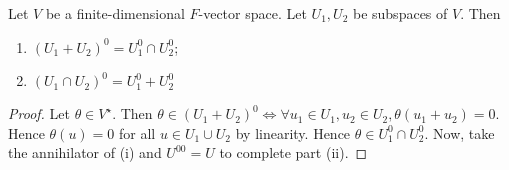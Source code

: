 \begin{lemma}
	Let $V$ be a finite-dimensional $F$-vector space.
	Let $U_1, U_2$ be subspaces of $V$.
	Then
	\begin{enumerate}
		\item $(U_1 + U_2)^0 = U_1^0 \cap U_2^0$;
		\item $(U_1 \cap U_2)^0 = U_1^0 + U_2^0$
	\end{enumerate}
\end{lemma}
\begin{proof}
	Let $\theta \in V^\star$.
	Then $\theta \in (U_1 + U_2)^0 \iff \forall u_1 \in U_1, u_2 \in U_2, \theta(u_1 + u_2) = 0$.
	Hence $\theta(u) = 0$ for all $u \in U_1 \cup U_2$ by linearity.
	Hence $\theta \in U_1^0 \cap U_2^0$.
	Now, take the annihilator of (i) and $U^{00} = U$ to complete part (ii).
\end{proof}